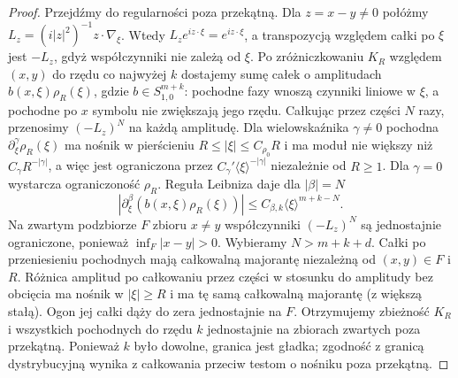 \begin{proof}
Przejdźmy do regularności poza przekątną.
Dla $z=x-y\ne0$ połóżmy
$L_z=(i|z|^2)^{-1}z\cdot\nabla_\xi$.
Wtedy $L_z e^{iz\cdot\xi}=e^{iz\cdot\xi}$,
a transpozycją względem całki po $\xi$ jest
$-L_z$, gdyż współczynniki nie zależą od $\xi$.
Po zróżniczkowaniu $K_R$ względem $(x,y)$ do rzędu
co najwyżej $k$ dostajemy sumę całek o amplitudach
$b(x,\xi)\rho_R(\xi)$, gdzie $b\in S^{m+k}_{1,0}$:
pochodne fazy wnoszą czynniki liniowe w $\xi$,
a pochodne po $x$ symbolu nie zwiększają jego rzędu.
Całkując przez części $N$ razy, przenosimy
$(-L_z)^N$ na każdą amplitudę.
Dla wielowskaźnika $\gamma\ne0$ pochodna
$\partial_\xi^\gamma\rho_R(\xi)$ ma nośnik
w pierścieniu $R\le|\xi|\le C_{\rho_0}R$
i ma moduł nie większy niż $C_\gamma R^{-|\gamma|}$,
a więc jest ograniczona przez
$C_\gamma'\langle\xi\rangle^{-|\gamma|}$ niezależnie
od $R\ge1$. Dla $\gamma=0$ wystarcza ograniczoność
$\rho_R$. Reguła Leibniza daje dla $|\beta|=N$
\[
 |\partial_\xi^\beta(b(x,\xi)\rho_R(\xi))|
 \le C_{\beta,k}\langle\xi\rangle^{m+k-N}.
\]
Na zwartym podzbiorze $F$ zbioru $x\ne y$
współczynniki $(-L_z)^N$ są jednostajnie ograniczone,
ponieważ $\inf_F|x-y|>0$.
Wybieramy $N>m+k+d$. Całki po przeniesieniu
pochodnych mają całkowalną majorantę niezależną
od $(x,y)\in F$ i $R$.
Różnica amplitud po całkowaniu przez części
w stosunku do amplitudy bez obcięcia ma nośnik
w $|\xi|\ge R$ i ma tę samą całkowalną majorantę
(z większą stałą). Ogon jej całki dąży do zera
jednostajnie na $F$.
Otrzymujemy zbieżność $K_R$ i wszystkich pochodnych
do rzędu $k$ jednostajnie na zbiorach zwartych
poza przekątną. Ponieważ $k$ było dowolne,
granica jest gładka; zgodność z granicą
dystrybucyjną wynika z całkowania przeciw testom
o nośniku poza przekątną.
\end{proof}

